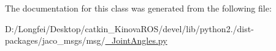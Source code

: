 The documentation for this class was generated from the following file\+:\begin{DoxyCompactItemize}
\item 
D\+:/\+Longfei/\+Desktop/catkin\+\_\+\+Kinova\+R\+O\+S/devel/lib/python2./dist-\/packages/jaco\+\_\+msgs/msg/\hyperlink{__JointAngles_8py}{\+\_\+\+Joint\+Angles.\+py}\end{DoxyCompactItemize}
